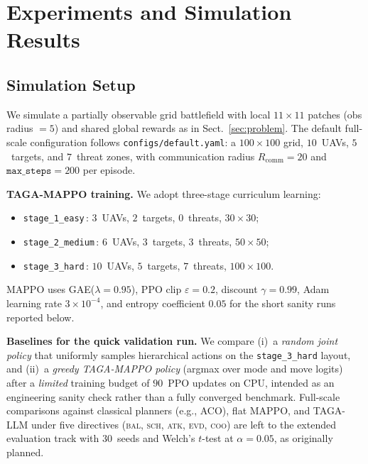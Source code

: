 
\section{Experiments and Simulation Results}
\label{sec:experiments}

\subsection{Simulation Setup}

We simulate a partially observable grid battlefield with local $11\!\times\!11$
patches (obs radius $=5$) and shared global rewards as in Sect.~\ref{sec:problem}.
The default full-scale configuration follows
\texttt{configs/default.yaml}: a $100\!\times\!100$ grid, $10$~UAVs,
$5$~targets, and $7$~threat zones, with communication radius
$R_{\mathrm{comm}}=20$ and $\texttt{max\_steps}=200$ per episode.

\textbf{TAGA-MAPPO training.} We adopt three-stage curriculum learning:
\begin{itemize}\setlength{\itemsep}{0pt}\setlength{\parskip}{0pt}
  \item \texttt{stage\_1\_easy}\,: $3$~UAVs, $2$~targets, $0$~threats, $30\!\times\!30$;
  \item \texttt{stage\_2\_medium}\,: $6$~UAVs, $3$~targets, $3$~threats, $50\!\times\!50$;
  \item \texttt{stage\_3\_hard}\,: $10$~UAVs, $5$~targets, $7$~threats, $100\!\times\!100$.
\end{itemize}
\noindent MAPPO uses GAE($\lambda=0.95$), PPO clip
$\varepsilon=0.2$, discount $\gamma=0.99$, Adam learning rate $3\times10^{-4}$,
and entropy coefficient $0.05$ for the short sanity runs reported below.

\textbf{Baselines for the quick validation run.}  We compare (i)~a \emph{random
joint policy} that uniformly samples hierarchical actions on the
\texttt{stage\_3\_hard} layout, and (ii)~a \emph{greedy TAGA-MAPPO policy}
(argmax over mode and move logits) after a \emph{limited} training budget of
$90$~PPO updates on CPU, intended as an engineering sanity check rather than a
fully converged benchmark.  Full-scale comparisons against classical planners
(e.g., ACO), flat MAPPO, and TAGA-LLM under five directives
(\textsc{bal}, \textsc{sch}, \textsc{atk}, \textsc{evd}, \textsc{coo}) are left
to the extended evaluation track with $30$~seeds and Welch's $t$-test at
$\alpha=0.05$, as originally planned.

